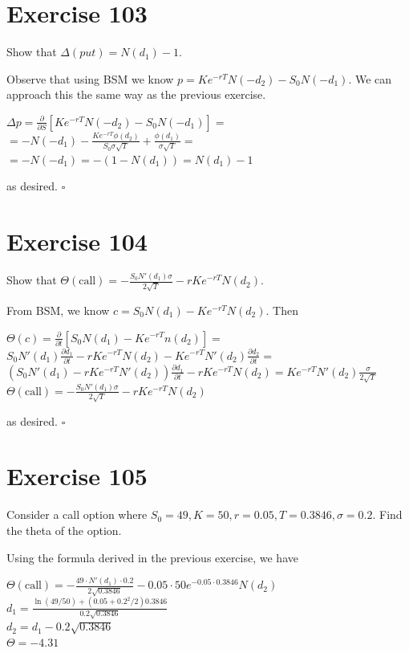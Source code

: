 \documentclass{article}
\begin{document}
\section*{Exercise 103}
Show that $\Delta (put) = N(d_1) - 1$.
\begin{flushleft}
    Observe that using BSM we know $p = Ke^{-rT}N(-d_2) - S_0N(-d_1)$. We can approach this the same way as the previous exercise.
    \begin{center}
        $\Delta p = \frac{\partial}{\partial S}[Ke^{-rT}N(-d_2) - S_0N(-d_1)] = $ \\
        $= -N(-d_1) - \frac{Ke^{-rT} \phi(d_2)}{S_0 \sigma \sqrt{T}} + \frac{\phi(d_1)}{\sigma \sqrt{T}} = $ \\
        $= -N(-d_1) = -(1-N(d_1)) = N(d_1) - 1$
    \end{center}
    as desired. $\square$
\end{flushleft}

\section*{Exercise 104}
Show that $\Theta(\text{call})=-\frac{S_0N'(d_1)\sigma}{2\sqrt{T}}-rKe^{-rT}N(d_2)$.
\begin{flushleft}
    From BSM, we know $c = S_0N(d_1) - Ke^{-rT}N(d_2)$. Then
    \begin{center}
        $\Theta(c) = \frac{\partial}{\partial t}[S_0N(d_1) - Ke^{-rT}n(d_2)] = $ \\
        $S_0N'(d_1) \frac{\partial d_1}{\partial t} - rKe^{-rT}N(d_2) - Ke^{-rT}N'(d_2) \frac{\partial d_2}{\partial t} = $ \\
        $(S_0N'(d_1) - rKe^{-rT}N'(d_2)) \frac{\partial d_1}{\partial t} - rKe^{-rT}N(d_2) = Ke^{-rT}N'(d_2) \frac{\sigma}{2\sqrt{T}}$ \\
        $\Theta(\text{call})=-\frac{S_0N'(d_1)\sigma}{2\sqrt{T}}-rKe^{-rT}N(d_2)$
    \end{center}
    as desired. $\square$
\end{flushleft}

\section*{Exercise 105}
Consider a call option where $S_0 = 49, K=50, r = 0.05, T = 0.3846, \sigma = 0.2$. Find the theta of the option.
\begin{flushleft}
    Using the formula derived in the previous exercise, we have
    \begin{center}
        $\Theta(\text{call})=-\frac{49 \cdot N'(d_1) \cdot 0.2}{2\sqrt{0.3846}}-0.05 \cdot 50e^{-0.05 \cdot 0.3846}N(d_2)$ \\
        $d_1 = \frac{\ln(49/50) + (0.05 + 0.2^2/2)0.3846}{0.2 \sqrt{0.3846}}$ \\
        $d_2 = d_1 - 0.2 \sqrt{0.3846}$ \\
        $\Theta = -4.31$
    \end{center}
\end{flushleft}
\end{document}
